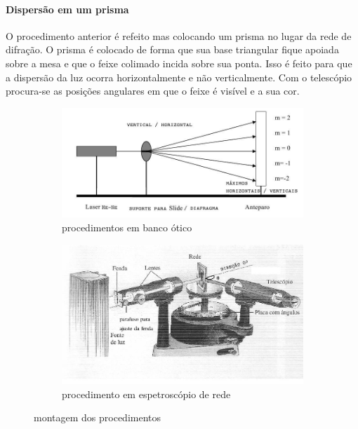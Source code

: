 \documentclass[a4paper,11pt]{article}
\begin{document}
\paragraph{Dispersão em um prisma}
O procedimento anterior é refeito mas colocando
um prisma no lugar da rede de difração. O prisma é colocado
de forma que sua base triangular fique apoiada sobre a mesa
e que o feixe colimado incida sobre sua ponta. Isso é feito
para que a dispersão da luz ocorra horizontalmente e não
verticalmente. Com o telescópio procura-se as posições
angulares em que o feixe é visível e a sua cor.

\FloatBarrier

\begin{figure}
  \begin{subfigure}{0.5\textwidth}
	    \includegraphics[width = 12 cm]{./images/montagem1.jpg}
	    \caption{procedimentos em banco ótico}
	    \label{fig:montagem}
	\end{subfigure}
	
	  \begin{subfigure}{0.5\textwidth}
	    \includegraphics[width = 12 cm]{./images/montagem2.jpg}
	    \caption{procedimento em espetroscópio de rede}
	    \label{fig:montagem2}
	\end{subfigure}
	
	\caption{montagem dos procedimentos}
\end{figure}
 \FloatBarrier
 \newpage
\end{document}
